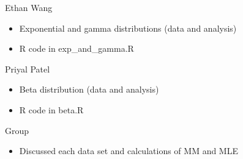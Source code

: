 \documentclass[12pt, letterpaper]{article}
\begin{document}
Ethan Wang
\begin{itemize}[leftmargin=50pt]
  \item Exponential and gamma distributions (data and analysis)
  \item R code in exp\_and\_gamma.R
\end{itemize}

Priyal Patel
\begin{itemize}[leftmargin=50pt]
  \item Beta distribution (data and analysis)
  \item R code in beta.R
\end{itemize}

Group
\begin{itemize}[leftmargin=50pt]
  \item Discussed each data set and calculations of MM and MLE
\end{itemize}
\end{document}
